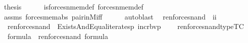 \begin{isabellebody}
\ {\isacharquery}{\kern0pt}thesis\isanewline
\ \ \ \ \isamarkupfalse%
\ is{\isacharunderscore}{\kern0pt}forces{\isacharunderscore}{\kern0pt}nmem{\isacharprime}{\kern0pt}{\isacharunderscore}{\kern0pt}def\ forces{\isacharunderscore}{\kern0pt}nmem{\isacharprime}{\kern0pt}{\isacharunderscore}{\kern0pt}def\isanewline
\ \ \ \ \isamarkupfalse%
\ assms\ forces{\isacharunderscore}{\kern0pt}mem{\isacharprime}{\kern0pt}{\isacharunderscore}{\kern0pt}abs\ pair{\isacharunderscore}{\kern0pt}in{\isacharunderscore}{\kern0pt}M{\isacharunderscore}{\kern0pt}iff\isanewline
\ \ \ \ \isamarkupfalse%
\ {\isacharparenleft}{\kern0pt}auto{\isacharcomma}{\kern0pt}blast{\isacharparenright}{\kern0pt}\isanewline
{}\isamarkupfalse%
%
\endisatagproof
{\isafoldproof}%
%
\isadelimproof
\isanewline
%
\endisadelimproof
\isanewline
{}\isamarkupfalse%
%
\isadelimdocument
%
\endisadelimdocument
%
\isatagdocument
%
\isamarkuptrue%
%
\endisatagdocument
{\isafolddocument}%
%
\isadelimdocument
%
\endisadelimdocument
{}\isamarkupfalse%
\isanewline
\ \ ren{\isacharunderscore}{\kern0pt}forces{\isacharunderscore}{\kern0pt}nand\ {\isacharcolon}{\kern0pt}{\isacharcolon}{\kern0pt}\ {\isachardoublequoteopen}i{\isasymRightarrow}i{\isachardoublequoteclose}\ \isanewline
\ \ {\isachardoublequoteopen}ren{\isacharunderscore}{\kern0pt}forces{\isacharunderscore}{\kern0pt}nand{\isacharparenleft}{\kern0pt}{\isasymphi}{\isacharparenright}{\kern0pt}\ {\isasymequiv}\ Exists{\isacharparenleft}{\kern0pt}And{\isacharparenleft}{\kern0pt}Equal{\isacharparenleft}{\kern0pt}{}{\isacharcomma}{\kern0pt}{}{\isacharparenright}{\kern0pt}{\isacharcomma}{\kern0pt}iterates{\isacharparenleft}{\kern0pt}{\isasymlambda}p{\isachardot}{\kern0pt}\ incr{\isacharunderscore}{\kern0pt}bv{\isacharparenleft}{\kern0pt}p{\isacharparenright}{\kern0pt}{\isacharbackquote}{\kern0pt}{}\ {\isacharcomma}{\kern0pt}\ {}{\isacharcomma}{\kern0pt}\ {\isasymphi}{\isacharparenright}{\kern0pt}{\isacharparenright}{\kern0pt}{\isacharparenright}{\kern0pt}{\isachardoublequoteclose}\isanewline
\isanewline
{}\isamarkupfalse%
\ ren{\isacharunderscore}{\kern0pt}forces{\isacharunderscore}{\kern0pt}nand{\isacharunderscore}{\kern0pt}type{\isacharbrackleft}{\kern0pt}TC{\isacharbrackright}{\kern0pt}\ {\isacharcolon}{\kern0pt}\isanewline
\ \ {\isachardoublequoteopen}{\isasymphi}{\isasymin}formula\ {\isasymLongrightarrow}\ ren{\isacharunderscore}{\kern0pt}forces{\isacharunderscore}{\kern0pt}nand{\isacharparenleft}{\kern0pt}{\isasymphi}{\isacharparenright}{\kern0pt}\ {\isasymin}formula{\isachardoublequoteclose}\isanewline

\end{isabellebody}
